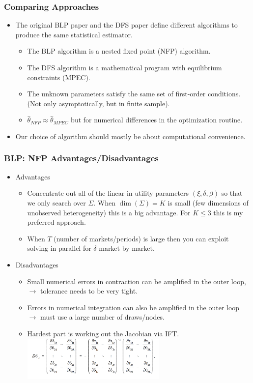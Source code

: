 \documentclass[xcolor=pdftex,dvipsnames,table,mathserif,aspectratio=169]{beamer}
\begin{document}
\begin{frame}
\frametitle{Comparing Approaches}
\begin{itemize}
\item The original BLP paper and the DFS paper define different \alert{algorithms} to produce the same statistical \alert{estimator}.
\begin{itemize}
\item The BLP algorithm is a \alert{nested fixed point} (NFP) algorithm. 
\item The DFS algorithm is a \alert{mathematical program with equilibrium constraints} (MPEC).
\item The unknown parameters satisfy the same set of first-order conditions. (Not only asymptotically, but in finite sample).
\item $\hat{\theta}_{NFP} \approx \hat{\theta}_{MPEC}$ but for numerical differences in the optimization routine.
\end{itemize}
\item Our choice of algorithm should mostly be about computational convenience.
\end{itemize}
\end{frame}

\begin{frame}
\frametitle{BLP: NFP Advantages/Disadvantages}
\begin{itemize}
\item Advantages
\begin{itemize}
\item Concentrate out all of the linear in utility parameters $(\xi,\delta,\beta)$ so that we only search over $\Sigma$. When $\dim(\Sigma)=K$ is small (few dimensions of unobserved heterogeneity) this is a big advantage. For $K \leq 3$ this is my preferred approach.
\item When $T$ (number of markets/periods) is large then you can exploit solving in parallel for $\delta$ market by market.
\end{itemize}
\item Disadvantages
\begin{itemize}
\item Small numerical errors in contraction can be amplified in the outer loop, $\rightarrow$ tolerance needs to be very tight.
\item Errors in numerical integration can also be amplified in the outer loop $\rightarrow$ must use a large number of draws/nodes.
\item Hardest part is working out the Jacobian via IFT.
\includegraphics[width=2.8in]{resources/implicit_function.png}\\
\end{itemize}
\end{itemize}
\end{frame}
\end{document}

